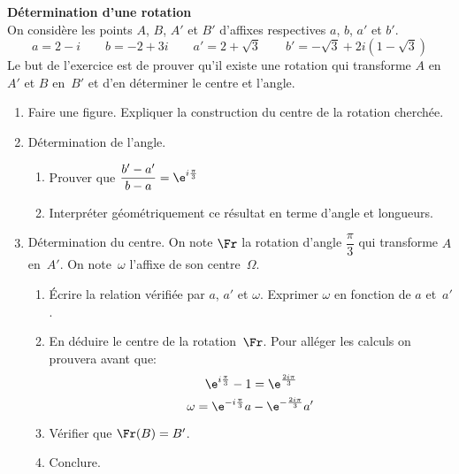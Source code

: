 \begin{exercice}
{\bf D\'etermination d'une rotation}\\
On consid\`ere les points $A$, $B$, $A'$ et $B'$ d'affixes respectives
$a$, $b$, $a'$ et $b'$.
\[a=2-i\qquad b=-2+3i\qquad a'=2+\sqrt3\qquad b'=-\sqrt3+2i(1-\sqrt3)\]
Le but de l'exercice est de prouver qu'il existe une rotation qui
transforme $A$ en $A'$ et $B$ en~$B'$ et d'en d\'eterminer le centre et l'angle.

\begin{enumerate}
\item Faire une figure. Expliquer la construction du centre de la
  rotation cherch\'ee.
\item D\'etermination de l'angle.
  \begin{enumerate}
  \item Prouver que $\dfrac{b'-a'}{b-a}=\e^{i\frac{\pi}{3}}$
  \item Interpr\'eter g\'eom\'etriquement ce r\'esultat en terme d'angle et longueurs.
  \end{enumerate}
\item D\'etermination du centre. On note $\Fr$ la rotation d'angle
  $\dfrac{\pi}{3}$ qui transforme $A$ en~$A'$. On note~$\omega$
  l'affixe de son centre~$\Omega$.
  \begin{enumerate}
  \item \'Ecrire la relation v\'erifi\'ee par $a$, $a'$ et
    $\omega$. Exprimer $\omega$ en fonction de $a$ et~$a'$.
  \item En    d\'eduire le centre de la rotation~$\Fr$. Pour all\'eger
    les calculs on prouvera avant que:
    \begin{equation}
      \label{eq:1}
      \e^{i\frac{\pi}{3}}-1=\e^{\frac{2i\pi}{3}}
    \end{equation}
\begin{equation}
      \label{eq:2}
      \omega=\e^{-i\frac{\pi}{3}}a-\e^{-\frac{2i\pi}{3}}a'
    \end{equation}
        

  \item V\'erifier que $\Fr(B)=B'$.
  \item Conclure.
  \end{enumerate}
\end{enumerate}
 
\end{exercice}
